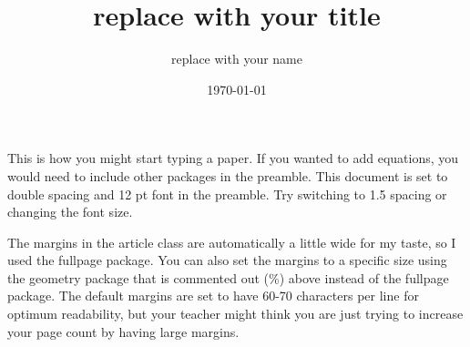 \documentclass[12pt]{article}
\title{replace with your title}
\author{replace with your name}
\date{\today}
\begin{document}
\maketitle

This is how you might start typing a paper. If you wanted to add equations, you 
would need to include other packages in the preamble. This document is set to 
double spacing and 12 pt font in the preamble. Try switching to 1.5 spacing or 
changing the font size.

The margins in the article class are automatically a little wide for my taste, 
so I used the fullpage package. You can also set the margins to a specific size 
using the geometry package that is commented out (\%) above instead of the fullpage
package. The default margins are set to have 60-70 
characters per line for optimum readability, but your teacher might think you are 
just trying to increase your page count by having large margins.
\end{document}
